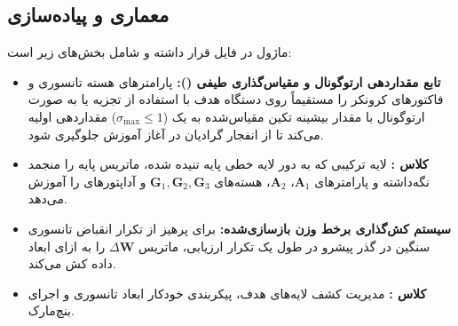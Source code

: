 \subsection{معماری و پیاده‌سازی}
ماژول در فایل  قرار داشته و شامل بخش‌های زیر است:
\begin{itemize}
    \item \textbf{تابع مقداردهی ارتوگونال و مقیاس‌گذاری طیفی ():} پارامترهای هسته تانسوری و فاکتورهای کرونکر را مستقیماً روی دستگاه هدف با استفاده از تجزیه  یا  به صورت ارتوگونال با مقدار بیشینه تکین مقیاس‌شده به یک ($\sigma_{\max} \le 1$) مقداردهی اولیه می‌کند تا از انفجار گرادیان در آغاز آموزش جلوگیری شود.
    \item \textbf{کلاس :} لایه ترکیبی که به دور لایه خطی پایه تنیده شده، ماتریس پایه را منجمد نگه‌داشته و پارامترهای $\mathbf{A}_1$، $\mathbf{A}_2$، هسته‌های $\mathbf{G}_1, \mathbf{G}_2, \mathbf{G}_3$ و آداپتورهای  را آموزش می‌دهد.
    \item \textbf{سیستم کش‌گذاری برخط وزن بازسازی‌شده:} برای پرهیز از تکرار انقباض تانسوری سنگین در گذر پیشرو در طول یک تکرار ارزیابی، ماتریس $\Delta \mathbf{W}$ را به ازای ابعاد داده کش می‌کند.
    \item \textbf{کلاس :} مدیریت کشف لایه‌های هدف، پیکربندی خودکار ابعاد تانسوری و اجرای بنچ‌مارک.
\end{itemize}
